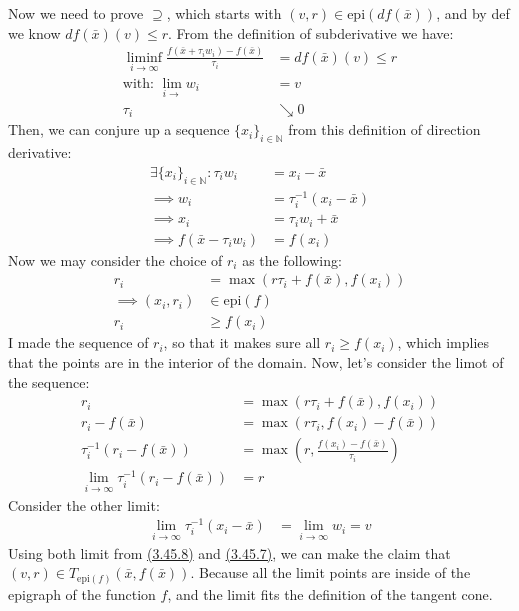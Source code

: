 \documentclass[]{article}
\begin{document}
    Now we need to prove $\supseteq$, which starts with $(v, r)\in \text{epi}(df(\bar{x}))$, and by def we know $df(\bar{x})(v) \le r$.
    From the definition of subderivative we have: 
    \begin{align*}\tag{3.45.4}\label{eqn:3.45.4}
        \liminf_{i \rightarrow \infty} \frac{f(\bar{x} + \tau_i w_i) - f(\bar{x})}{\tau_i} 
        &= 
        df(\bar{x})(v) \le r
        \\
        \text{with: }\lim_{i\rightarrow } w_i &= v 
        \\
        \tau_i &\searrow 0
    \end{align*}
    Then, we can conjure up a sequence $\{x_i\}_{i\in \mathbb{N}}$ from this definition of direction derivative: 
    \begin{align*}\tag{3.45.5}\label{eqn:3.45.5}
        \exists \{x_i\}_{i\in \mathbb{N}} : \tau_i w_i &= x_i - \bar{x}
        \\
        \implies
        w_i &= \tau_i^{-1}(x_i - \bar{x})
        \\
        \implies 
        x_i &= \tau_i w_i + \bar{x}
        \\
        \implies f(\bar{x} - \tau_i w_i) &= f(x_i)
    \end{align*}
    Now we may consider the choice of $r_i$ as the following: 
    \begin{align*}\tag{3.45.6}\label{eqn:3.45.6}
        r_i &= \max(r\tau_i + f(\bar{x}), f(x_i))
        \\
        \implies (x_i, r_i) &\in \text{epi}(f) 
        \\
        r_i &\ge f(x_i)
    \end{align*}
    I made the sequence of $r_i$, so that it makes sure all $r_i \ge f(x_i)$, which implies that the points are in the interior of the domain. Now, let's consider the limot of the sequence: 
    \begin{align*}\tag{3.45.7}\label{eqn:3.45.7}
        r_i &= \max(r\tau_i + f(\bar{x}), f(x_i))
        \\
        r_i - f(\bar{x}) &= \max(r\tau_i, f(x_i) - f(\bar{x}))
        \\
        \tau_i^{-1}(r_i - f(\bar{x})) &= \max\left(
            r, \frac{f(x_i) - f(\bar{x})}{\tau_i}
        \right)
        \\
        \lim_{i\rightarrow \infty} \tau_i^{-1}(r_i - f(\bar{x})) &= r
    \end{align*}
    Consider the other limit: 
    \begin{align*}\tag{3.45.8}\label{eqn:3.45.8}
        \lim_{i\rightarrow \infty} \tau_i^{-1}(x_i - \bar{x}) &= \lim_{i\rightarrow \infty} w_i = v
    \end{align*}
    Using both limit from \hyperref[eqn:3.45.8]{(3.45.8)} and \hyperref[eqn:3.45.7]{(3.45.7)}, we can make the claim that $(v, r) \in T_{\text{epi}(f)}(\bar{x}, f(\bar{x}))$. Because all the limit points are inside of the epigraph of the function $f$, and the limit fits the definition of the tangent cone. 
\end{document}
